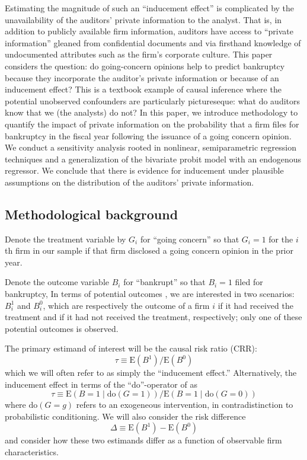 \documentclass[aoas,preprint, 11pt, dvipsnames, table, x11name]{imsart}
\newcommand{\E}{\mbox{E}}
\theoremstyle{remark}
\begin{document}
Estimating the magnitude of such an ``inducement effect'' is complicated by the unavailability of the auditors' private information to the analyst. That is, in addition to publicly available firm information, auditors have access to ``private information'' gleaned from confidential documents and via firsthand knowledge of undocumented attributes such as the firm's corporate culture. This paper considers the question: do going-concern opinions help to predict bankruptcy because they incorporate the auditor's private information or because of an inducement effect? This is a textbook example of causal inference where the potential unobserved confounders are particularly pictureseque: what do auditors know that we (the analysts) do not? In this paper, we introduce methodology to quantify the impact of private information on the probability that a firm files for bankruptcy in the fiscal year following the issuance of a going concern opinion.  We conduct a sensitivity analysis rooted in nonlinear, semiparametric regression techniques and a generalization of the bivariate probit model with an endogenous regressor. We conclude that there is evidence for inducement under plausible assumptions on the distribution of the auditors' private information.



\subsection{Methodological background}

Denote the treatment variable by $G_i$ for ``going concern'' so that $G_i = 1$ for the $i$th firm in our sample if that firm disclosed a going concern opinion in the prior year. 

Denote the outcome variable $B_i$ for ``bankrupt'' so that $B_i = 1$ filed for bankruptcy, 
  In terms of potential outcomes \citep{rubin}, we are interested in two scenarios: $B^1_i$ and $B^0_i$, which are respectively the outcome of a firm $i$ if it had received the treatment and if it had not received the treatment, respectively; only one of these potential outcomes is observed. 


The primary estimand of interest will be the causal risk ratio (CRR):
\begin{equation}
	\tau \equiv \E(B^1)/\E(B^0)
\end{equation}
which we will often refer to as simply the ``inducement effect.'' Alternatively, the inducement effect in terms of the ``do''-operator of \cite{pearl-2000} as 
 \begin{equation}
	\tau \equiv \E(B=1 \mid \text{do}(G=1))/\E(B=1 \mid \text{do}(G=0))
\end{equation}
where $\text{do}(G=g)$ refers to an exogeneous intervention, in contradistinction to probabilistic conditioning. We will also consider the risk difference
\begin{equation}
	\Delta \equiv \E(B^1) - \E(B^0)
\end{equation}
and consider how these two estimands differ as a function of observable firm characteristics.
\end{document}
